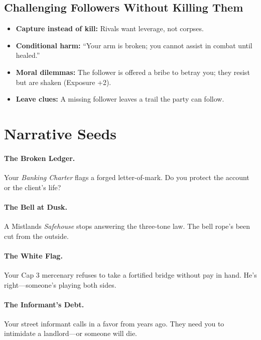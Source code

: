 \subsection*{Challenging Followers Without Killing Them}
\begin{itemize}
  \item \textbf{Capture instead of kill:} Rivals want leverage, not corpses.
  \item \textbf{Conditional harm:} “Your arm is broken; you cannot assist in combat until healed.”
  \item \textbf{Moral dilemmas:} The follower is offered a bribe to betray you; they resist but are shaken (Exposure +2).
  \item \textbf{Leave clues:} A missing follower leaves a trail the party can follow.
\end{itemize}

\section{Narrative Seeds}
\paragraph{The Broken Ledger.}
Your \emph{Banking Charter} flags a forged letter-of-mark. Do you protect the account or the client's life?

\paragraph{The Bell at Dusk.}
A Mistlands \emph{Safehouse} stops answering the three-tone law. The bell rope's been cut from the outside.

\paragraph{The White Flag.}
Your Cap 3 mercenary refuses to take a fortified bridge without pay in hand. He's right—someone's playing both sides.

\paragraph{The Informant’s Debt.}
Your street informant calls in a favor from years ago. They need you to intimidate a landlord—or someone will die.

